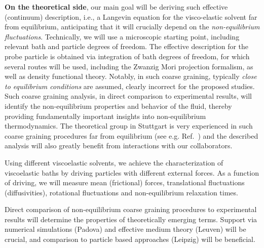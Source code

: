 \begin{workpackage}
\begin{wpdescription}
{\bf On the theoretical side}, our main goal will be deriving such effective (continuum)
description, i.e., a Langevin equation for the visco-elastic solvent far from equilibrium,
anticipating that it will crucially depend on the {\it non-equilibrium
  fluctuations}. Technically, we will use a microscopic starting point, including relevant
bath and particle degrees of freedom. The effective description for the probe particle is
obtained via integration of bath degrees of freedom, for which several routes will be used,
including the Zwanzig Mori projection formalism, as well as density functional
theory. Notably, in such coarse graining, typically {\it close to equilibrium conditions}
are assumed, clearly incorrect for the proposed studies. Such coarse graining analysis, in
direct comparison to experimental results, will identify the non-equilibrium properties and
behavior of the fluid, thereby providing fundamentally important insights into
non-equilibrium thermodynamics. The theoretical group in Stuttgart is very experienced in
such coarse graining procedures far from equilibrium (see e.g. Ref.~\cite{Aerov14}) and the described analysis will also
greatly benefit from interactions with our collaborators.


\end{wpdescription}

\begin{tasklist}

\begin{task}[title=Experimental characterization of viscoelastic baths,id=brown-t1,PM=24,lead=USTUTT,wphases=0-24!1.0]
Using different viscoelastic solvents, we achieve the characterization of viscoelastic baths
by driving particles with different external forces. As a function of driving, we will
measure mean (frictional) forces, translational fluctuations (diffusivities), rotational
fluctuations and non-equilibrium relaxation times.
\end{task}

\begin{task}[title=Theoretical identification of non-equilibrium signatures of the bath,id=brown-t1-bis,PM=24,lead=USTUTT,wphases=0-24!1.0,partners={KUL,UNIPD,ULEI}]
Direct comparison of non-equilibrium coarse graining procedures to experimental results will
determine the properties of theoretically emerging terms. Support via numerical simulations
(Padova) and effective medium theory (Leuven) will be crucial, and comparison to particle
based approaches (Leipzig) will be beneficial.
\end{task}


\end{tasklist}
\end{workpackage}
